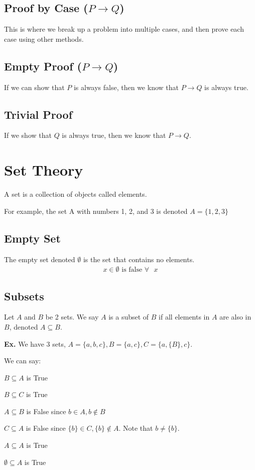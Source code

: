 \documentclass[12pt,letterpaper]{article} \usepackage{amsmath} \usepackage{graphicx}  \usepackage{longtable}  \usepackage{amssymb}
\begin{document}
        \subsection{Proof by Case ($P \rightarrow Q$)}
        This is where we break up a problem into multiple cases, and then prove each case using other methods. 

        \subsection{Empty Proof ($P \rightarrow Q$)}
        If we can show that $P$ is always false, then we know that $P \rightarrow Q$ is always true. 

        \subsection{Trivial Proof}
        If we show that $Q$ is always true, then we know that $P \rightarrow Q$.

    \section{Set Theory}
    A set is a collection of objects called elements. 

    For example, the set A with numbers 1, 2, and 3 is denoted $A=\{1,2,3\}$

        \subsection{Empty Set}
        The empty set denoted $\emptyset$ is the set that contains no elements. 
        \begin{align*}
            x\in\emptyset \text{ is false } \forall \text{ }x
        \end{align*}

        \subsection{Subsets}
        Let $A$ and $B$ be 2 sets. We say $A$ is a subset of $B$ if all elements in $A$ are also in $B$, denoted $A\subseteq B$.

        \begin{mdframed}
            \textbf{Ex. } We have 3 sets, $A=\{a,b,c\}, B=\{a,c\}, C=\{a,\{B\},c\}$.

            We can say:
            
            $B\subseteq A$ is True

            $B\subseteq C$ is True

            $A\subseteq B$ is False since $b\in A, b\notin B$

            $C\subseteq A$ is False since $\{b\} \in C, \{b\} \notin A$. Note that $b\ne \{b\}$.

            $A\subseteq A$ is True

            $\emptyset \subseteq A$ is True
        \end{mdframed}
\end{document}
